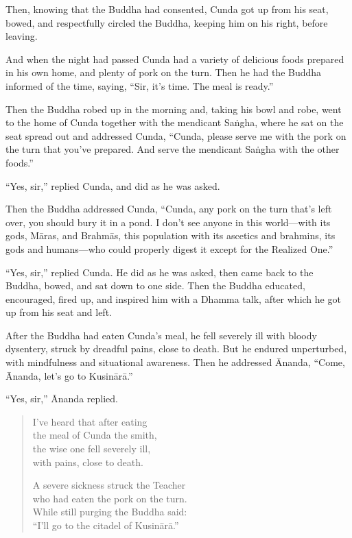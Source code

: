\documentclass[12pt,openany]{book}%
\begin{document}
Then, knowing that the Buddha had consented, Cunda got up from his seat, bowed, and respectfully circled the Buddha, keeping him on his right, before leaving. 

And when the night had passed Cunda had a variety of delicious foods prepared in his own home, and plenty of pork on the turn. Then he had the Buddha informed of the time, saying, “Sir, it’s time. The meal is ready.” 

Then the Buddha robed up in the morning and, taking his bowl and robe, went to the home of Cunda together with the mendicant \textsanskrit{Saṅgha}, where he sat on the seat spread out and addressed Cunda, “Cunda, please serve me with the pork on the turn that you’ve prepared. And serve the mendicant \textsanskrit{Saṅgha} with the other foods.” 

“Yes, sir,” replied Cunda, and did as he was asked. 

Then the Buddha addressed Cunda, “Cunda, any pork on the turn that’s left over, you should bury it in a pond. I don’t see anyone in this world—with its gods, \textsanskrit{Māras}, and \textsanskrit{Brahmās}, this population with its ascetics and brahmins, its gods and humans—who could properly digest it except for the Realized One.” 

“Yes, sir,” replied Cunda. He did as he was asked, then came back to the Buddha, bowed, and sat down to one side. Then the Buddha educated, encouraged, fired up, and inspired him with a Dhamma talk, after which he got up from his seat and left. 

After the Buddha had eaten Cunda’s meal, he fell severely ill with bloody dysentery, struck by dreadful pains, close to death. But he endured unperturbed, with mindfulness and situational awareness. Then he addressed Ānanda, “Come, Ānanda, let’s go to \textsanskrit{Kusinārā}.” 

“Yes, sir,” Ānanda replied. 

\begin{verse}%
I’ve heard that after eating \\
the meal of Cunda the smith, \\
the wise one fell severely ill, \\
with pains, close to death. 

A severe sickness struck the Teacher \\
who had eaten the pork on the turn. \\
While still purging the Buddha said: \\
“I’ll go to the citadel of \textsanskrit{Kusinārā}.” 

%
\end{verse}
\end{document}
